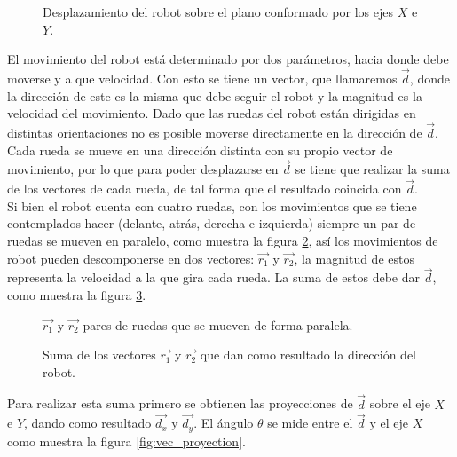 \documentclass{iccmemoria}
\begin{document}
\begin{figure}[H]
  \centering
  \selectfont{
  
  }
  \caption{Desplazamiento del robot sobre el plano conformado por los ejes $X$ e $Y$.}
  \label{fig:omni_direcition}
\end{figure}

El movimiento del robot está determinado por dos parámetros, hacia donde debe moverse y a que velocidad. Con esto se tiene un vector, que llamaremos $\vec{d}$, donde la dirección de este es la misma que debe seguir el robot y la magnitud es la velocidad del movimiento. Dado que las ruedas del robot están dirigidas en distintas orientaciones no es posible moverse directamente en la dirección de $\vec{d}$. Cada rueda se mueve en una dirección distinta con su propio vector de movimiento, por lo que para poder desplazarse en $\vec{d}$ se tiene que realizar la suma de los vectores de cada rueda, de tal forma que el resultado coincida con $\vec{d}$.\\

Si bien el robot cuenta con cuatro ruedas, con los movimientos que se tiene contemplados hacer (delante, atrás, derecha e izquierda) siempre un par de ruedas se mueven en paralelo, como muestra la figura \ref{fig:omni_vector}, así los movimientos de robot pueden descomponerse en dos vectores: $\vec{r_{1}}$ y $\vec{r_{2}}$, la magnitud de estos representa la velocidad a la que gira cada rueda. La suma de estos debe dar $\vec{d}$, como muestra la figura \ref{fig:vec_sum}.\\

\begin{figure}[H]
  \centering
  \begin{large}
  
  \end{large}
  \caption{$\vec{r_{1}}$ y $\vec{r_{2}}$ pares de ruedas que se mueven de forma paralela.}
  \label{fig:omni_vector}
\end{figure}

\begin{figure}[H]
  \centering
  \begin{large}
  
  \end{large}
  \caption{Suma de los vectores $\vec{r_{1}}$ y $\vec{r_{2}}$ que dan como resultado la dirección del robot.}
  \label{fig:vec_sum}
\end{figure}

Para realizar esta suma primero se obtienen las proyecciones de $\vec{d}$ sobre el eje $X$ e $Y$, dando como resultado $\vec{d_{x}}$ y $\vec{d_{y}}$. El ángulo $\theta$ se mide entre el $\vec{d}$ y el eje $X$ como muestra la figura \ref{fig:vec_proyection}.\\
\end{document}
